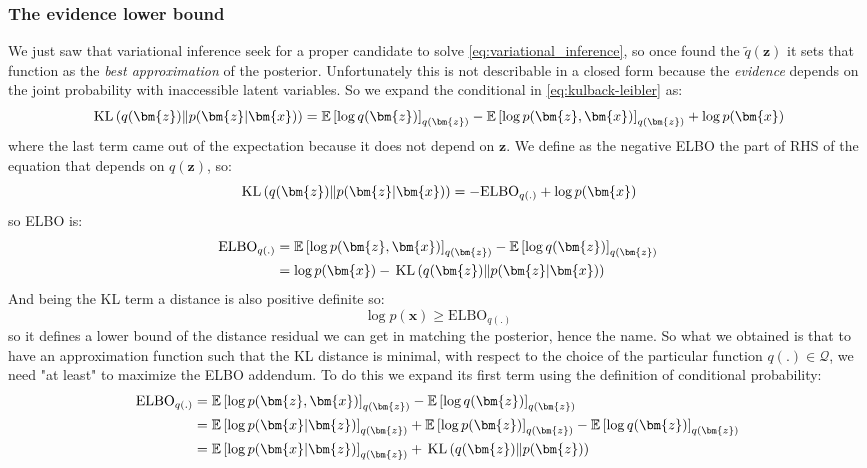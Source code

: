 \subsubsection{The evidence lower bound}
We just saw that variational inference seek for a proper candidate to solve \eqref{eq:variational_inference}, so once found the $\tilde{q}(\bm{z})$ it sets that function as the \textit{best approximation} of the posterior. Unfortunately this is not describable in a closed form because the \textit{evidence} depends on the joint probability with inaccessible latent variables.
So we expand the conditional in \cref{eq:kulback-leibler} as:
\begin{equation}
    \KLD{q(\bm{z})}{p(\bm{z}|\bm{x})} = \expectation{\log q(\bm{z})}_{q(\bm{z})}
                                        - \expectation{\log p(\bm{z},\bm{x})}_{q(\bm{z})} 
                                        + \log p(\bm{x})
\end{equation}
where the last term came out of the expectation because it does not depend on $\bm{z}$. 
We define as the negative \ac{ELBO} the part of RHS of the equation that depends on $q(\bm{z})$, so:
\begin{equation}
    \KLD{q(\bm{z})}{p(\bm{z}|\bm{x})} = - \mathrm{ELBO}_{q(.)} + \log p(\bm{x})
\end{equation}
so \acs{ELBO} is:
\begin{align*}
    \mathrm{ELBO}_{q(.)} &= \expectation{\log p(\bm{z},\bm{x})}_{q(\bm{z})} - \expectation{\log q(\bm{z})}_{q(\bm{z})} \\
                         &= \log p(\bm{x}) - \KLD{q(\bm{z})}{p(\bm{z}|\bm{x})} 
\end{align*}
And being the KL term a distance is also positive definite so:
\begin{equation}
    \log p(\bm{x}) \geqslant \mathrm{ELBO}_{q(.)}
\end{equation}
so it defines a lower bound of the distance residual we can get in matching the posterior, hence the name. So what we obtained is that to have an approximation function such that the KL distance is minimal, with respect to the choice of the particular function $q(.) \in \mathcal{Q}$, we need "at least" to maximize the \acs{ELBO} addendum.
To do this we expand its first term using the definition of conditional probability:
\begin{align*}
    \mathrm{ELBO}_{q(.)} &= \expectation{\log p(\bm{z},\bm{x})}_{q(\bm{z})} - \expectation{\log q(\bm{z})}_{q(\bm{z})} \\
                         &= \expectation{\log p(\bm{x}|\bm{z})}_{q(\bm{z})} + \expectation{\log p(\bm{z})}_{q(\bm{z})} - \expectation{\log q(\bm{z})}_{q(\bm{z})} \\
                         &= \expectation{\log p(\bm{x}|\bm{z})}_{q(\bm{z})} + \KLD{q(\bm{z})}{p(\bm{z})}
\end{align*}

